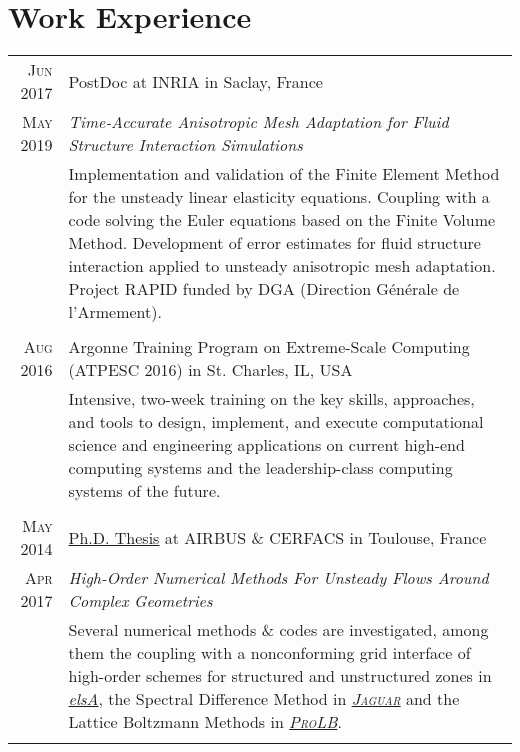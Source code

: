 \documentclass[a4paper,10pt]{article}
\begin{document}
\section{Work Experience}
\begin{tabular}{r|p{15cm}}

\textsc{Jun 2017}   & PostDoc at \textsc{INRIA} in Saclay, France \\
\textsc{May 2019}   & \emph{Time-Accurate Anisotropic Mesh Adaptation for Fluid Structure Interaction Simulations} \\
                    & \footnotesize{Implementation and validation of the Finite Element Method for the unsteady linear elasticity equations.
                    Coupling with a code solving the Euler equations based on the Finite Volume Method. Development of error estimates
                    for fluid structure interaction applied to unsteady anisotropic mesh adaptation.
                    Project RAPID funded by DGA (Direction G\'en\'erale de l'Armement). } \\
                    \multicolumn{2}{c}{} \\

\textsc{Aug 2016}   & Argonne Training Program on Extreme-Scale Computing (ATPESC 2016) in St. Charles, IL, USA \\
                    & \footnotesize{Intensive, two-week training on the key skills, approaches, and tools 
                    to design, implement, and execute computational science and engineering applications 
                    on current high-end computing systems and the leadership-class computing systems of the future.} \\
                    \multicolumn{2}{c}{} \\

\textsc{May 2014}   & \href{http://oatao.univ-toulouse.fr/17967/1/vanharen.pdf}{Ph.D. Thesis} at \textsc{AIRBUS} \& \textsc{CERFACS} in Toulouse, France \\
\textsc{Apr 2017}   & \emph{High-Order Numerical Methods For Unsteady Flows Around Complex Geometries} \\
                    & \footnotesize{Several numerical methods \& codes are investigated, among them the coupling with a 
                    nonconforming grid interface of high-order schemes for structured and unstructured 
                    zones in \href{http://elsa.onera.fr}{\emph{elsA}},
                    the Spectral Difference Method in \href{http://www.cerfacs.fr/~puigt/jaguar.html}{\emph{\textsc{Jaguar}}}
                    and the Lattice Boltzmann Methods in \href{http://www.prolb-cfd.com}{\emph{\textsc{ProLB}}}.} \\
                    \multicolumn{2}{c}{} \\


\end{tabular}
\end{document}
